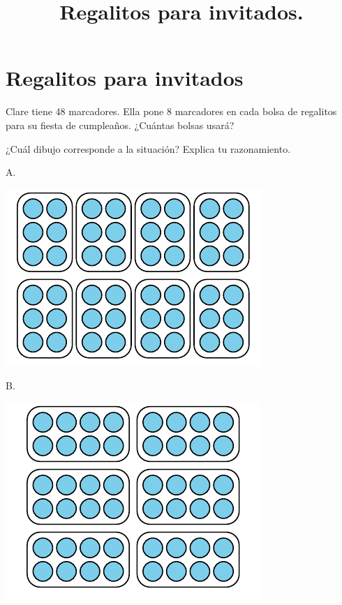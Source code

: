 \documentclass[,]{article}
\title{Regalitos para invitados.}
\date{}
\begin{document}
\section*{Regalitos para invitados}
Clare tiene 48 marcadores. Ella pone 8 marcadores en cada bolsa de regalitos para su fiesta de cumpleaños. ¿Cuántas bolsas usará?%
\par
¿Cuál dibujo corresponde a la situación? Explica tu razonamiento.%
\begin{sidebyside}{2}{0}{0}{0}%
\begin{sbspanel}{0.5}%
A.%
\par
\includegraphics[max width=\linewidth,center]{../svg-source/tikz-file-246306.pdf}
\end{sbspanel}%
\begin{sbspanel}{0.5}%
B.%
\par
\includegraphics[max width=\linewidth,center]{../svg-source/tikz-file-246307.pdf}
\end{sbspanel}%
\end{sidebyside}%
\end{document}
